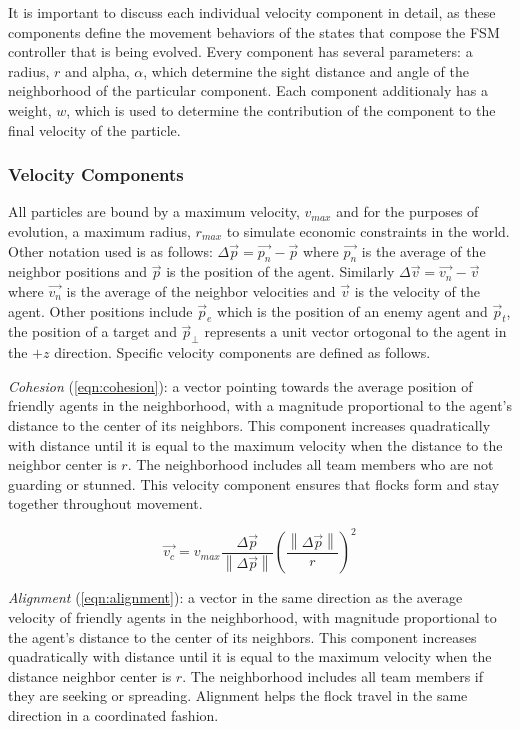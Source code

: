 \documentclass[12pt,journal,compsoc]{IEEEtran}
\begin{document}
It is important to discuss each individual velocity component in detail, as these components define the movement behaviors of the states that compose the FSM controller that is being evolved. Every component has several parameters: a radius, $r$ and alpha, $\alpha$, which determine the sight distance and angle of the neighborhood of the particular component. Each component additionaly has a weight, $w$, which is used to determine the contribution of the component to the final velocity of the particle.

\subsubsection{Velocity Components}

All particles are bound by a maximum velocity, $v_{max}$ and for the purposes of evolution, a maximum radius, $r_{max}$ to simulate economic constraints in the world. Other notation used is as follows: $\Delta \vec {p} = \vec {p_n} - \vec {p}$ where $\vec {p_n}$ is the average of the neighbor positions and $\vec p$ is the position of the agent. Similarly $\Delta \vec {v} = \vec {v_n} - \vec v$ where $\vec {v_n}$ is the average of the neighbor velocities and $\vec v$ is the velocity of the agent. Other positions include $\vec p_e$ which is the position of an enemy agent and $\vec p_t$, the position of a target and $\vec p_\perp$ represents a unit vector ortogonal to the agent in the $+z$ direction. Specific velocity components are defined as follows.

\textit{Cohesion} (\ref{eqn:cohesion}): a vector pointing towards the average position of friendly agents in the neighborhood, with a magnitude proportional to the agent's distance to the center of its neighbors. This component increases quadratically with distance until it is equal to the maximum velocity when the distance to the neighbor center is $r$. The neighborhood includes all team members who are not guarding or stunned. This velocity component ensures that flocks form and stay together throughout movement.

\begin{equation}
    \vec { v_{ c } } =v_{ max }\frac { \Delta  \vec { p }  }{ \left\|   \Delta \vec { p }  \right\|  } \left( \frac { \left\|  \Delta \vec {  p }  \right\|  }{ r }  \right) ^{ 2 }
    \label{eqn:cohesion}
\end{equation}

\textit{Alignment} (\ref{eqn:alignment}): a vector in the same direction as the average velocity of friendly agents in the neighborhood, with magnitude proportional to the agent's distance to the center of its neighbors. This component increases quadratically with distance until it is equal to the maximum velocity when the distance neighbor center is $r$. The neighborhood includes all team members if they are seeking or spreading. Alignment helps the flock travel in the same direction in a coordinated fashion.
\end{document}
